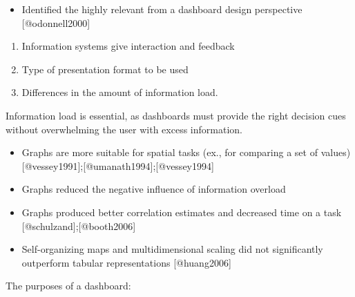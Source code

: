\documentclass[
]{article}
\providecommand{\tightlist}{%
  \setlength{\itemsep}{0pt}\setlength{\parskip}{0pt}}
\begin{document}

\begin{itemize}
\tightlist
\item
  Identified the highly relevant from a dashboard design perspective
  {[}@odonnell2000{]}
\end{itemize}

\begin{enumerate}
\def\labelenumi{\arabic{enumi}.}
\tightlist
\item
  Information systems give interaction and feedback
\item
  Type of presentation format to be used
\item
  Differences in the amount of information load.
\end{enumerate}

Information load is essential, as dashboards must provide the right
decision cues without overwhelming the user with excess information.



\begin{itemize}
\tightlist
\item
  Graphs are more suitable for spatial tasks (ex., for comparing a set
  of values) {[}@vessey1991{]};{[}@umanath1994{]};{[}@vessey1994{]}
\item
  Graphs reduced the negative influence of information overload
\item
  Graphs produced better correlation estimates and decreased time on a
  task {[}@schulzand{]};{[}@booth2006{]}
\item
  Self-organizing maps and multidimensional scaling did not
  significantly outperform tabular representations {[}@huang2006{]}
\end{itemize}

The purposes of a dashboard:
\end{document}
